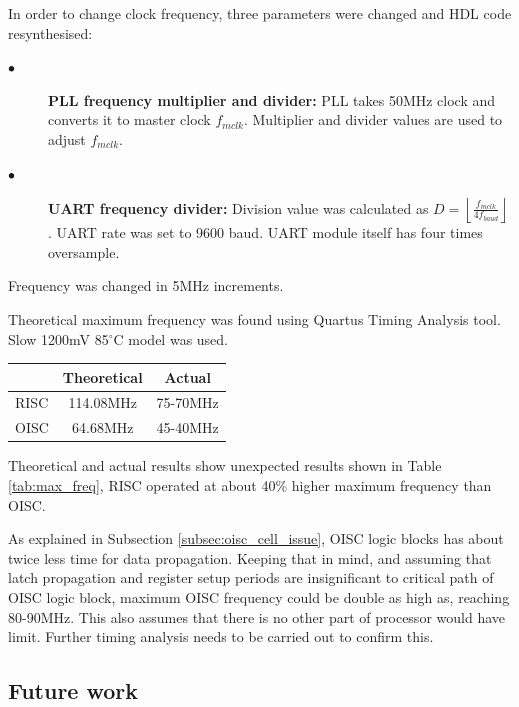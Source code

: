 In order to change clock frequency, three parameters were changed and HDL code resynthesised: 
\begin{description}
	\item[$\bullet$] \textbf{PLL frequency multiplier and divider:}
	PLL takes 50MHz clock and converts it to master clock $f_{mclk}$. Multiplier and divider values are used to adjust $f_{mclk}$.
	
	\item[$\bullet$] \textbf{UART frequency divider:}
	Division value was calculated as $D = \left \lfloor \frac{f_{mclk}}{4 f_{baud}} \right \rfloor$. UART rate was set to 9600 baud. UART module itself has four times oversample. 
\end{description}
Frequency was changed in 5MHz increments. 

Theoretical maximum frequency was found using Quartus Timing Analysis tool. Slow 1200mV 85$^{\circ}$C model was used. 

\begin{center}
	\begin{tabular}{ l | c | c  }
		     & Theoretical & Actual \\ \hline
		RISC & 114.08MHz & 75-70MHz \\ \hline
		OISC & 64.68MHz & 45-40MHz \\
	\end{tabular}
	\label{tab:max_freq}
\end{center}

Theoretical and actual results show unexpected results shown in Table \ref{tab:max_freq}, RISC operated at about 40\% higher maximum frequency than OISC.

As explained in Subsection \ref{subsec:oisc_cell_issue}, OISC logic blocks has about twice less time for data propagation. Keeping that in mind, and assuming that latch propagation and register setup periods are insignificant to critical path of OISC logic block, maximum OISC frequency could be double as high as, reaching 80-90MHz. This also assumes that there is no other part of processor would have limit. Further timing analysis needs to be carried out to confirm this.

\subsection{Future work}


